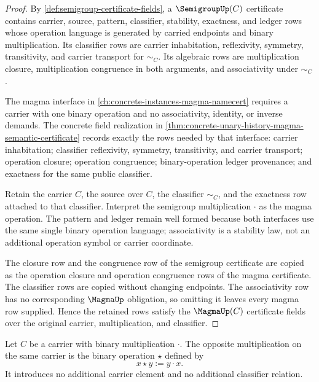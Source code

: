 \begin{proof}
By \autoref{def:semigroup-certificate-fields}, a $\SemigroupUp(C)$ certificate
contains carrier, source, pattern, classifier, stability, exactness, and ledger
rows whose operation language is generated by carried endpoints and binary
multiplication. Its classifier rows are carrier inhabitation, reflexivity,
symmetry, transitivity, and carrier transport for $\sim_C$. Its algebraic rows
are multiplication closure, multiplication congruence in both arguments, and
associativity under $\sim_C$.

The magma interface in \autoref{ch:concrete-instances-magma-namecert} requires
a carrier with one binary operation and no associativity, identity, or inverse
demands. The concrete field realization in
\autoref{thm:concrete-unary-history-magma-semantic-certificate} records exactly
the rows needed by that interface: carrier inhabitation; classifier
reflexivity, symmetry, transitivity, and carrier transport; operation closure;
operation congruence; binary-operation ledger provenance; and exactness for the
same public classifier.

Retain the carrier $C$, the source over $C$, the classifier $\sim_C$, and the
exactness row attached to that classifier. Interpret the semigroup
multiplication $\cdot$ as the magma operation. The pattern and ledger remain
well formed because both interfaces use the same single binary operation
language; associativity is a stability law, not an additional operation symbol
or carrier coordinate.

The closure row and the congruence row of the semigroup certificate are copied
as the operation closure and operation congruence rows of the magma
certificate. The classifier rows are copied without changing endpoints. The
associativity row has no corresponding $\MagmaUp$ obligation, so omitting it
leaves every magma row supplied. Hence the retained rows satisfy the
$\MagmaUp(C)$ certificate fields over the original carrier, multiplication, and
classifier.
\end{proof}

\begin{definition}
\label{def:opposite-semigroup-operation}
Let $C$ be a carrier with binary multiplication $\cdot$. The opposite multiplication on the same carrier is the binary operation $\star$ defined by
$$
x\star y:=y\cdot x.
$$
It introduces no additional carrier element and no additional classifier relation.
\end{definition}


